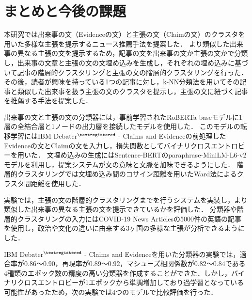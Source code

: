 \documentclass[12pt,a4j]{jreport}
\begin{document}


\chapter{まとめと今後の課題}


本研究では出来事の文（Evidenceの文）と主張の文（Claimの文）のクラスタを用いた多様な主張を提示するニュース推薦手法を提案した．
より類似した出来事の異なる主張の文を提示するため，記事の文を出来事の文か主張の文かで分類し，出来事の文章と主張の文の文埋め込みを生成し，それぞれの埋め込みに基づいて記事の階層的クラスタリングと主張の文の階層的クラスタリングを行った．
その後，読者が興味を持っている1つの記事に対し，k-NN分類法を用いてその記事と類似した出来事を扱う主張の文のクラスタを提示し，主張の文に紐づく記事を推薦する手法を提案した．

出来事の文と主張の文の分類器には，事前学習されたRoBERTa baseモデルに1層の全結合層と1ノードの出力層を接続したモデルを使用した．
このモデルの転移学習にはIBM Debater$^{\textregistered}$ - Claims and Evidenceの前処理したEvidenceの文とClaimの文を入力し，損失関数としてバイナリクロスエントロピーを用いた．
文埋め込みの生成にはSentence-BERTのparaphrase-MiniLM-L6-v2モデルを利用し，提案システムが文の意味と文脈を加味できるようにした．
階層的クラスタリングでは文埋め込み間のコサイン距離を用いたWard法によるクラスタ間距離を使用した．

実験では，主張の文の階層的クラスタリングまでを行うシステムを実装し，より類似した出来事の異なる主張の文を提示できているかを評価した．
分類器や階層的クラスタリングの入力にはCOVID-19 News Articlesの5000件の英語の記事を使用し，政治や文化の違いに由来する3ヶ国の多様な主張が分析できるようにした．

IBM Debater$^{\textregistered}$ - Claims and Evidenceを用いた分類器の実験では，適合率が0.86～0.90，再現率が0.89～0.92，マシューズ相関係数が0.82～0.84である4種類のエポック数の精度の高い分類器を作成することができた．しかし，バイナリクロスエントロピーが1エポックから単調増加しており過学習となっている可能性があったため，次の実験では4つのモデルで比較評価を行った．
\end{document}
